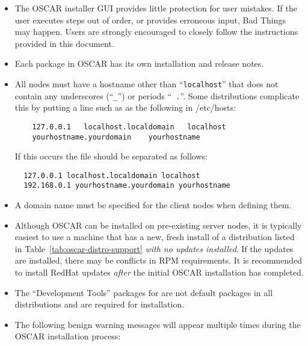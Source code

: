 \begin{itemize}

\item The OSCAR installer GUI provides little protection for user
  mistakes.  If the user executes steps out of order, or provides
  erroneous input, Bad Things may happen.  Users are strongly
  encouraged to closely follow the instructions provided in this
  document.

\item Each package in OSCAR has its own installation and release
  notes.   

\begchange
\item All nodes must have a hostname other than ``{\tt localhost}''
  that does not contain any underscores (``{\tt \_}'') or periods ``{\tt
  .}''.  Some distributions complicate this by putting a line such
  as as the following in /etc/hosts:
  \begin{verbatim}
    127.0.0.1   localhost.localdomain   localhost
    yourhostname.yourdomain    yourhostname
  \end{verbatim}
  If this occurs the file should be separated as follows:
  \begin{verbatim}
  127.0.0.1 localhost.localdomain localhost
  192.168.0.1 yourhostname.yourdomain yourhostname
  \end{verbatim}
\endchange

\item A domain name must be specified for the client nodes when
  defining them.

\item Although OSCAR can be installed on pre-existing server nodes, it
  is typically easiest to use a machine that has a new, fresh install
  of a distribution listed in Table~\ref{tab:oscar-distro-support}
  {\em with no updates installed}.  If the updates are installed,
  there may be conflicts in RPM requirements.  It is recommended to
  install RedHat updates {\em after} the initial OSCAR installation has
  completed.

\item The ``Development Tools'' packages for are not default packages in
all distributions and are required for installation.

\item The following benign warning messages will appear multiple times
  during the OSCAR installation process:


\end{itemize}
